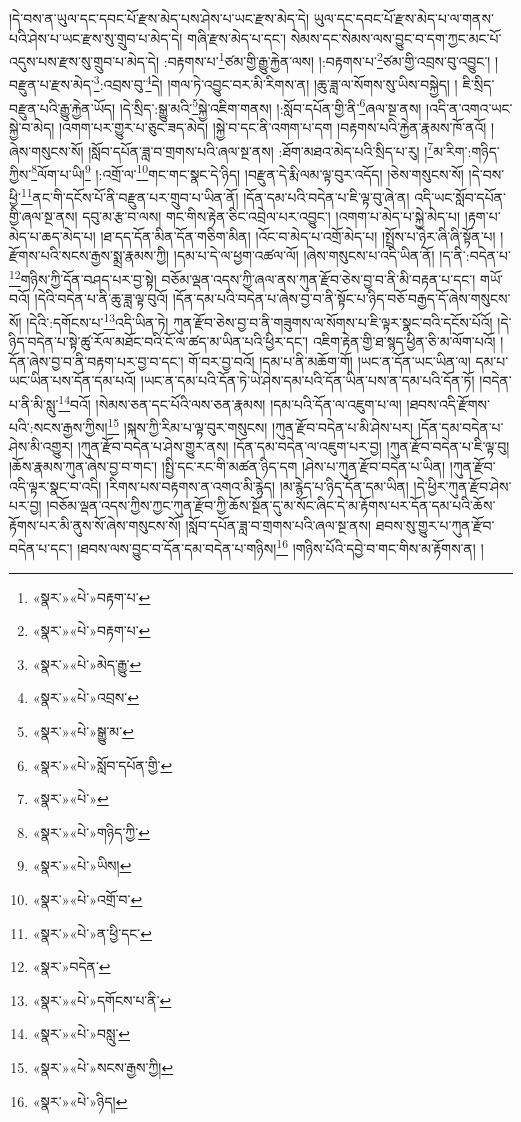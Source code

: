 །དེ་བས་ན་ཡུལ་དང་དབང་པོ་རྫས་མེད་པས་ཤེས་པ་ཡང་རྫས་མེད་དེ། ཡུལ་དང་དབང་པོ་རྫས་མེད་པ་ལ་གནས་པའི་ཤེས་པ་ཡང་རྫས་སུ་གྲུབ་པ་མེད་དེ། གཞི་རྫས་མེད་པ་དང་། སེམས་དང་སེམས་ལས་བྱུང་བ་དག་ཀྱང་མང་པོ་འདུས་པས་རྫས་སུ་གྲུབ་པ་མེད་དེ། :བརྟགས་པ་\footnote{«སྣར་»«པེ་»བརྟག་པ་}ཙམ་གྱི་རྒྱུ་རྐྱེན་ལས། །:བརྟགས་པ་\footnote{«སྣར་»«པེ་»བརྟག་པ་}ཙམ་གྱི་འབྲས་བུ་འབྱུང་། །བརྫུན་པ་རྫས་མེད་\footnote{«སྣར་»«པེ་»མེད་རྒྱུ་}:འབྲས་བུ་\footnote{«སྣར་»«པེ་»འབྲས་}དེ། །གལ་ཏེ་འབྱུང་བར་མི་རིགས་ན། །ཆུ་ཟླ་ལ་སོགས་སུ་ཡིས་བསྐྱེད། །
ཇི་སྲིད་བརྫུན་པའི་རྒྱུ་རྐྱེན་ཡོད། །དེ་སྲིད་:སྒྱུ་མའི་\footnote{«སྣར་»«པེ་»སྒྱུ་མ་}སྐྱེ་འཇིག་གནས། །:སློབ་དཔོན་གྱི་ནི་\footnote{«སྣར་»«པེ་»སློབ་དཔོན་གྱི་}ཞལ་སྔ་ནས། །འདི་ན་འགའ་ཡང་སྐྱེ་བ་མེད། །འགག་པར་གྱུར་པ་ཅུང་ཟད་མེད། །སྐྱེ་བ་དང་ནི་འགག་པ་དག །བརྟགས་པའི་རྐྱེན་རྣམས་ཁོ་ནའོ། །ཞེས་གསུངས་སོ། །སློབ་དཔོན་ཟླ་བ་གྲགས་པའི་ཞལ་སྔ་ནས། :ཐོག་མཐའ་མེད་པའི་སྲིད་པ་རུ། །\footnote{«སྣར་»«པེ་»}མ་རིག་:གཉིད་ཀྱིས་\footnote{«སྣར་»«པེ་»གཉིད་ཀྱི་}ལོག་པ་ཡི།\footnote{«སྣར་»«པེ་»ཡིས།} །:འགྲོ་ལ་\footnote{«སྣར་»«པེ་»འགྲོ་བ་}གང་གང་སྣང་དེ་ཉིད། །བརྫུན་དེ་རྨི་ལམ་ལྟ་བུར་འདོད། །ཅེས་གསུངས་སོ། །དེ་བས་ཕྱི་\footnote{«སྣར་»«པེ་»ན་ཕྱི་དང་}ནང་གི་དངོས་པོ་ནི་བརྫུན་པར་གྲུབ་པ་ཡིན་ནོ། །དོན་དམ་པའི་བདེན་པ་ཇི་ལྟ་བུ་ཞེ་ན། འདི་ཡང་སློབ་དཔོན་གྱི་ཞལ་སྔ་ནས། དབུ་མ་རྩ་བ་ལས། གང་གིས་རྟེན་ཅིང་འབྲེལ་པར་འབྱུང་། །འགག་པ་མེད་པ་སྐྱེ་མེད་པ། །རྟག་པ་མེད་པ་ཆད་མེད་པ། །ཐ་དད་དོན་མིན་དོན་གཅིག་མིན། །འོང་བ་མེད་པ་འགྲོ་མེད་པ། །སྤྲོས་པ་ཉེར་ཞི་ཞི་སྟོན་པ། །རྫོགས་པའི་སངས་རྒྱས་སྨྲ་རྣམས་ཀྱི། །དམ་པ་དེ་ལ་ཕྱག་འཚལ་ལོ། །ཞེས་གསུངས་པ་འདི་ཡིན་ནོ། །ད་ནི་:བདེན་པ་\footnote{«སྣར་»བདེན་}གཉིས་ཀྱི་དོན་བཤད་པར་བྱ་སྟེ། བཅོམ་ལྡན་འདས་ཀྱི་ཞལ་ནས་ཀུན་རྫོབ་ཅེས་བྱ་བ་ནི་མི་བརྟན་པ་དང་། གཡོ་བའོ། །དེའི་བདེན་པ་ནི་ཆུ་ཟླ་ལྟ་བུའོ། །དོན་དམ་པའི་བདེན་པ་ཞེས་བྱ་བ་ནི་སྟོང་པ་ཉིད་བཅོ་བརྒྱད་དོ་ཞེས་གསུངས་སོ། །དེའི་:དགོངས་པ་\footnote{«སྣར་»«པེ་»དགོངས་པ་ནི་}འདི་ཡིན་ཏེ། ཀུན་རྫོབ་ཅེས་བྱ་བ་ནི་གཟུགས་ལ་སོགས་པ་ཇི་ལྟར་སྣང་བའི་དངོས་པོའོ། །དེ་ཉིད་བདེན་པ་སྟེ་ཚུ་རོལ་མཐོང་བའི་ངོ་ལ་ཚད་མ་ཡིན་པའི་ཕྱིར་དང་། འཇིག་རྟེན་གྱི་ཐ་སྙད་ཕྱིན་ཅི་མ་ལོག་པའོ། །དོན་ཞེས་བྱ་བ་ནི་བརྟག་པར་བྱ་བ་དང་། གོ་བར་བྱ་བའོ། །དམ་པ་ནི་མཆོག་གོ། །ཡང་ན་དོན་ཡང་ཡིན་ལ། དམ་པ་ཡང་ཡིན་པས་དོན་དམ་པའོ། །ཡང་ན་དམ་པའི་དོན་ཏེ་ཡེ་ཤེས་དམ་པའི་དོན་ཡིན་པས་ན་དམ་པའི་དོན་ཏོ། །བདེན་པ་ནི་མི་སླུ་\footnote{«སྣར་»«པེ་»བསླུ་}བའོ། །སེམས་ཅན་དང་པོའི་ལས་ཅན་རྣམས། །དམ་པའི་དོན་ལ་འཇུག་པ་ལ། །ཐབས་འདི་རྫོགས་པའི་:སངས་རྒྱས་ཀྱིས།\footnote{«སྣར་»«པེ་»སངས་རྒྱས་ཀྱི།} །སྐས་ཀྱི་རིམ་པ་ལྟ་བུར་གསུངས། །ཀུན་རྫོབ་བདེན་པ་མི་ཤེས་པར། །དོན་དམ་བདེན་པ་ཤེས་མི་འགྱུར། །ཀུན་རྫོབ་བདེན་པ་ཤེས་གྱུར་ནས། །དོན་དམ་བདེན་ལ་འཇུག་པར་བྱ། །ཀུན་རྫོབ་བདེན་པ་ཇི་ལྟ་བུ། །ཆོས་རྣམས་ཀུན་ཞེས་བྱ་བ་གང་། །སྤྱི་དང་རང་གི་མཚན་ཉིད་དག །ཤེས་པ་ཀུན་རྫོབ་བདེན་པ་ཡིན། །ཀུན་རྫོབ་འདི་ལྟར་སྣང་བ་འདི། །རིགས་པས་བརྟགས་ན་འགའ་མི་རྙེད། །མ་རྙེད་པ་ཉིད་དོན་དམ་ཡིན། །དེ་ཕྱིར་ཀུན་རྫོབ་ཤེས་པར་བྱ། །བཅོམ་ལྡན་འདས་ཀྱིས་ཀྱང་ཀུན་རྫོབ་ཀྱི་ཆོས་སྔོན་དུ་མ་སོང་ཞིང་དེ་མ་རྟོགས་པར་དོན་དམ་པའི་ཆོས་རྟོགས་པར་མི་ནུས་སོ་ཞེས་གསུངས་སོ། །སློབ་དཔོན་ཟླ་བ་གྲགས་པའི་ཞལ་སྔ་ནས། ཐབས་སུ་གྱུར་པ་ཀུན་རྫོབ་བདེན་པ་དང་། །ཐབས་ལས་བྱུང་བ་དོན་དམ་བདེན་པ་གཉིས།\footnote{«སྣར་»«པེ་»ཉིད།} །གཉིས་པོའི་དབྱེ་བ་གང་གིས་མ་རྟོགས་ན། །
